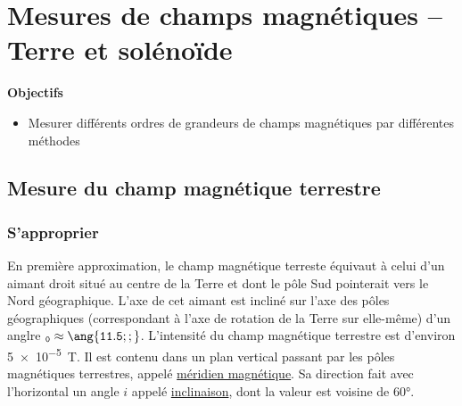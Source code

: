 \documentclass[a4paper, 11pt, final, garamond]{book}
\begin{document}
\setcounter{chapter}{29}

\chapter{Mesures de champs magnétiques -- Terre et soléno\"ide}
\begin{center}
  \Large
  \textbf{Objectifs}
\end{center}
\begin{itemize}[label=$\diamond$, leftmargin=10pt]
  \item Mesurer différents ordres de grandeurs de champs magnétiques par
    différentes méthodes
\end{itemize}

\section{Mesure du champ magnétique terrestre}
\label{sec:chpT}
\subsection{S'approprier}
\label{ssec:chpTapp}
En première approximation, le champ magnétique terreste équivaut à celui d'un
aimant droit situé au centre de la Terre et dont le pôle Sud pointerait vers le
Nord géographique. L'axe de cet aimant est incliné sur l'axe des pôles
géographiques (correspondant à l'axe de rotation de la Terre sur elle-même) d'un
anglre $\tt_0 \approx \ang{11.5;;}$.
\smallbreak
L'intensité du champ magnétique terrestre est d'environ \SI{5e-5}{T}. Il est
contenu dans un plan vertical passant par les pôles magnétiques terrestres,
appelé \ul{méridien magnétique}. Sa direction fait avec l'horizontal un angle $i$
appelé \ul{inclinaison}, dont la valeur est voisine de \ang{60;;}.
\end{document}
